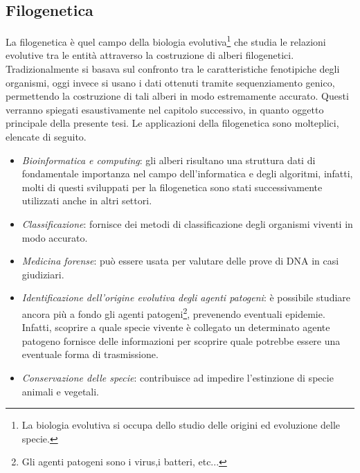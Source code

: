 \subsection{Filogenetica}
La filogenetica è quel campo della biologia evolutiva\footnote{La biologia evolutiva si occupa dello studio delle origini ed evoluzione delle specie.} che studia le relazioni evolutive tra le entità attraverso la costruzione di alberi filogenetici.
Tradizionalmente si basava sul confronto tra le caratteristiche fenotipiche degli organismi, oggi invece si usano i dati ottenuti tramite sequenziamento genico, permettendo la costruzione di tali alberi in modo estremamente accurato. Questi verranno spiegati esaustivamente nel capitolo successivo, in quanto oggetto principale della presente tesi.
\newline
Le applicazioni della filogenetica sono molteplici, elencate di seguito.
\begin{itemize}
	\item \textit{Bioinformatica e computing}: gli alberi risultano una struttura dati di fondamentale importanza nel campo dell'informatica e degli algoritmi, infatti, molti di questi sviluppati per la filogenetica sono stati successivamente utilizzati anche in altri settori.
	\item \textit{Classificazione}: fornisce dei metodi di classificazione degli organismi viventi in modo accurato.
	\item \textit{Medicina forense}: può essere usata per valutare delle prove di DNA in casi giudiziari.
	\item \textit{Identificazione dell'origine evolutiva degli agenti patogeni}: è possibile studiare ancora più a fondo gli agenti patogeni\footnote{Gli agenti patogeni sono i virus,i  batteri, etc...}, prevenendo eventuali epidemie. Infatti, scoprire a quale specie vivente è collegato un determinato agente patogeno fornisce delle informazioni per scoprire quale potrebbe essere una eventuale forma di trasmissione.
	\item \textit{Conservazione delle specie}: contribuisce ad impedire l'estinzione di specie animali e vegetali.
\end{itemize}


